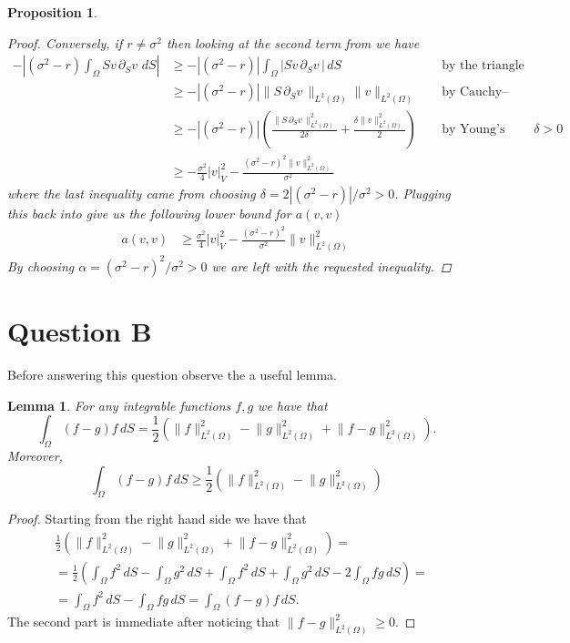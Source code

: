 \documentclass{article}
\newtheorem{lemma}[thm]{Lemma}
\newtheorem{prop}[thm]{Proposition}
\newcommand{\intS}[1]{\ensuremath{\int_{\Omega}#1 \, dS}}
\newcommand{\darg}[2]{\ensuremath{\, \partial_{#2}#1} \, }
\newcommand{\dS}[1]{\ensuremath{\darg{#1}{S}}}
\newcommand{\dSv}{\dS{v}}
\newcommand{\norm}[1]{\ensuremath{\|#1\|_{L^2(\Omega)}}}
\newcommand{\seminormsq}[1]{\ensuremath{|#1|_V^2}}
\newcommand{\normsq}[1]{\ensuremath{\|#1\|_{L^2(\Omega)}^2}}
\begin{document}
\begin{prop}
\begin{proof}
        Conversely, if $r \neq \sigma^2$ then looking at the second term from  we have
        \begin{align*}
            - \left| (\sigma^2 - r) \intS{S v \dSv}\right| &\geq - \left| (\sigma^2 - r) \right| \intS{\left|S v \dSv \right|} && \text{ by the triangle inequality}\\
            &\geq -\left| (\sigma^2 - r) \right| \norm{S \dSv} \norm{v} && \text{ by Cauchy–Schwarz inequality}\\
            &\geq -\left| (\sigma^2 - r) \right| \left( \frac{ \normsq{S \dSv}}{2 \delta} + \frac{\delta \normsq{v}}{2}\right) && \text{ by Young's inequality, $\delta >0$}\\
            & \geq - \frac{\sigma^2}{4} \seminormsq{v} - \frac{(\sigma^2 - r)^2 \normsq{v}}{ \sigma^2}
        \end{align*}
        where the last inequality came from choosing $\delta = 2| (\sigma^2 - r) | / \sigma^2 >0$. Plugging this back into  give us the following lower bound for $a(v,v)$
        \begin{align*}
            a(v,v) &\geq \frac{\sigma^2}{4} \seminormsq{v} - \frac{(\sigma^2 - r)^2}{ \sigma^2} \normsq{v}
        \end{align*}
        By choosing $\alpha = (\sigma^2 - r)^2 / \sigma^2 > 0$ we are left with the requested inequality.\qedhere
    \end{proof}
\end{prop}

\section{Question B}
Before answering this question observe the a useful lemma.
\begin{lemma}\label{lemma_alg_id_and_ineq}
    For any integrable functions $f, g$ we have that
    \begin{equation*}
        \intS{(f - g)f} = \frac{1}{2}\left( \normsq{f} - \normsq{g} + \normsq{f - g}\right).
    \end{equation*}
    Moreover,
    $$\intS{(f - g)f} \geq \frac{1}{2}\left( \normsq{f} - \normsq{g} \right)$$
\end{lemma}
\begin{proof}
    Starting from the right hand side we have that
    \begin{align*}
        &\frac{1}{2}\left( \normsq{f} - \normsq{g} + \normsq{f - g}\right) =\\
        &=\frac{1}{2}\left(\intS{f^2} -  \intS{g^2} + \intS{f^2} +  \intS{g^2} - 2\intS{fg} \right) =\\
        &=\intS{f^2} - \intS{fg} = \intS{(f - g)f}.
    \end{align*}
    The second part is immediate after noticing that $\normsq{f - g} \geq 0$.
\end{proof}
\end{document}
